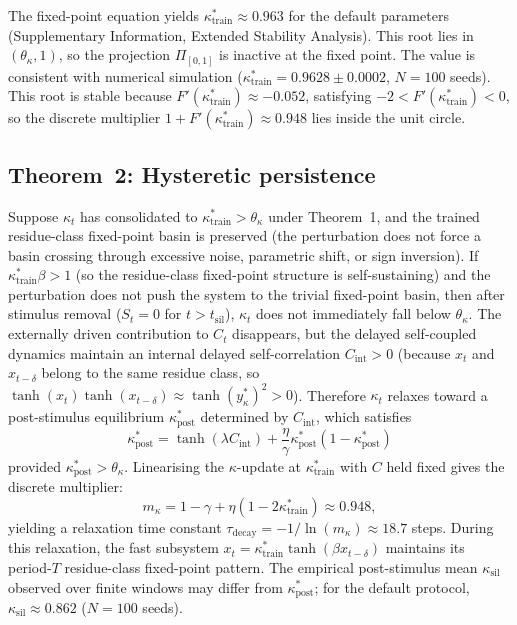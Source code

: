 The fixed-point equation yields $\kappa^*_{\mathrm{train}} \approx 0.963$ for the default parameters (Supplementary Information, Extended Stability Analysis). This root lies in $(\theta_\kappa, 1)$, so the projection $\Pi_{[0,1]}$ is inactive at the fixed point. The value is consistent with numerical simulation ($\kappa^*_{\mathrm{train}} = 0.9628 \pm 0.0002$, $N=100$ seeds). This root is stable because $F'(\kappa^*_{\mathrm{train}}) \approx -0.052$, satisfying $-2 < F'(\kappa^*_{\mathrm{train}}) < 0$, so the discrete multiplier $1 + F'(\kappa^*_{\mathrm{train}}) \approx 0.948$ lies inside the unit circle.

\subsection{Theorem~2: Hysteretic persistence}

\begin{theorem}\label{thm:hysteresis}
Suppose $\kappa_t$ has consolidated to $\kappa^*_{\mathrm{train}} > \theta_\kappa$ under Theorem~1, and the trained residue-class fixed-point basin is preserved (the perturbation does not force a basin crossing through excessive noise, parametric shift, or sign inversion). If $\kappa^*_{\mathrm{train}}\beta > 1$ (so the residue-class fixed-point structure is self-sustaining) and the perturbation does not push the system to the trivial fixed-point basin, then after stimulus removal ($S_t = 0$ for $t > t_{\mathrm{sil}}$), $\kappa_t$ does not immediately fall below $\theta_\kappa$. The externally driven contribution to $C_t$ disappears, but the delayed self-coupled dynamics maintain an internal delayed self-correlation $C_{\mathrm{int}} > 0$ (because $x_t$ and $x_{t-\delta}$ belong to the same residue class, so $\tanh(x_t)\tanh(x_{t-\delta}) \approx \tanh(y_\kappa^*)^2 > 0$). Therefore $\kappa_t$ relaxes toward a post-stimulus equilibrium $\kappa^*_{\mathrm{post}}$ determined by $C_{\mathrm{int}}$, which satisfies
\begin{equation}\label{eq:postfp}
\kappa^*_{\mathrm{post}} = \tanh(\lambda C_{\mathrm{int}}) + \frac{\eta}{\gamma}\kappa^*_{\mathrm{post}}(1-\kappa^*_{\mathrm{post}})
\end{equation}
provided $\kappa^*_{\mathrm{post}} > \theta_\kappa$. Linearising the $\kappa$-update at $\kappa^*_{\mathrm{train}}$ with $C$ held fixed gives the discrete multiplier:
\begin{equation}\label{eq:taudecay}
m_\kappa = 1 - \gamma + \eta(1-2\kappa^*_{\mathrm{train}}) \approx 0.948,
\end{equation}
yielding a relaxation time constant $\tau_{\mathrm{decay}} = -1/\ln(m_\kappa) \approx 18.7$ steps. During this relaxation, the fast subsystem $x_t = \kappa^*_{\mathrm{train}}\tanh(\beta x_{t-\delta})$ maintains its period-$T$ residue-class fixed-point pattern. The empirical post-stimulus mean $\kappa_{\mathrm{sil}}$ observed over finite windows may differ from $\kappa^*_{\mathrm{post}}$; for the default protocol, $\kappa_{\mathrm{sil}} \approx 0.862$ ($N=100$ seeds).
\end{theorem}

